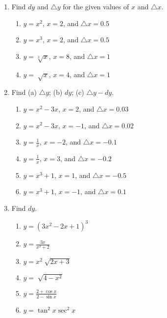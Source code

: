 \documentclass[12pt]{article}
\begin{document}
    \begin{enumerate}
        
        \item Find \(dy\) and \(\triangle{y}\) for the given values of \(x\) and \(\triangle{x}\).
        \begin{enumerate}[label*=\arabic*.]
            \item \(y = x^2\), \(x = 2\), and \(\triangle{x} = 0.5\)
            \item \(y = x^3\), \(x = 2\), and \(\triangle{x} = 0.5\)
            \item \(y = \sqrt[3]{x}\), \(x = 8\), and \(\triangle{x} = 1\)
            \item \(y = \sqrt[]{x}\), \(x = 4\), and \(\triangle{x} = 1\)
        \end{enumerate}

        \item Find (a) \(\triangle{y}\); (b) \(dy\); (c) \(\triangle{y} - dy\).
        \begin{enumerate}[label*=\arabic*.]
            \item \(y = x^2 - 3x\), \(x = 2\), and \(\triangle{x} = 0.03\)
            \item \(y = x^2 - 3x\), \(x = -1\), and \(\triangle{x} = 0.02\)
            \item \(y = \frac{1}{x}\), \(x = -2\), and \(\triangle{x} = -0.1\)
            \item \(y = \frac{1}{x}\), \(x = 3\), and \(\triangle{x} = -0.2\)
            \item \(y = x^3 + 1\), \(x = 1\), and \(\triangle{x} = -0.5\)
            \item \(y = x^3 + 1\), \(x = -1\), and \(\triangle{x} = 0.1\)
        \end{enumerate}

        \item Find \(dy\).
        \begin{enumerate}[label*=\arabic*.]
            \item \(y = {(3x^2 - 2x + 1)}^3\)
            \item \(y = \frac{3x}{x^2 + 2}\)
            \item \(y = x^2\sqrt[]{2x + 3}\)
            \item \(y = \sqrt[]{4 - x^2}\)
            \item \(y = \frac{2 + \cos{x}}{2 - \sin{x}}\)
            \item \(y = \tan^2{x} \sec^2{x}\)
        \end{enumerate}


\end{enumerate}
\end{document}
